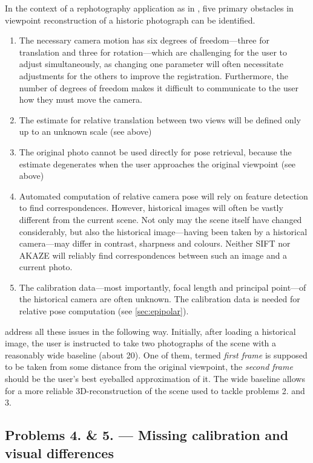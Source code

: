 In the context of a rephotography application as in \citep{bae2010}, five
primary obstacles in viewpoint reconstruction of a historic photograph can be
identified.
\begin{enumerate}
   \item The necessary camera motion has six degrees of freedom---three for
      translation and three for rotation---which are challenging for the user
      to adjust simultaneously, as changing one parameter will often necessitate
      adjustments for the others to improve the registration. Furthermore, the
      number of degrees of freedom makes it difficult to communicate to the
      user how they must move the camera.
   \item The estimate for relative translation between two views will be defined
      only up to an unknown scale (see above)
   \item The original photo cannot be used directly for pose retrieval, because
      the estimate degenerates when the user approaches the original viewpoint
      (see above)
   \item Automated computation of relative camera pose will rely on feature
      detection to find correspondences. However, historical images will often
      be vastly different from the current scene. Not only may the scene itself
      have changed considerably, but also the historical image---having been
      taken by a historical camera---may differ in contrast, sharpness and
      colours. Neither SIFT nor AKAZE will reliably find correspondences between
      such an image and a current photo.
   \item The calibration data---most importantly, focal length and principal
      point---of the historical camera are often unknown. The calibration data
      is needed for relative pose computation (see \autoref{sec:epipolar}).
\end{enumerate}

\citet{bae2010} address all these issues in the following way.
Initially, after loading a historical image, the user is instructed to
take two photographs of the scene with a reasonably wide baseline (about
20\textdegree). One of them, termed \emph{first frame} is supposed to be
taken from some distance from the original viewpoint, the \emph{second
frame} should be the user's best eyeballed approximation of it. The wide
baseline allows for a more reliable 3D-reconstruction of the scene used to
tackle problems 2. and 3. 

\subsection*{Problems 4. \& 5. --- Missing calibration and visual differences}



